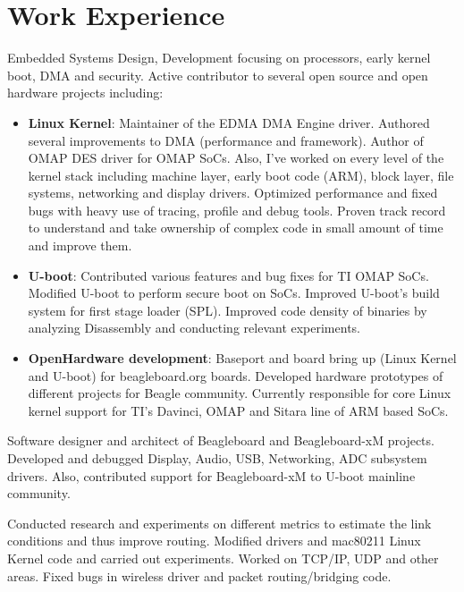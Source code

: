 \documentclass[11pt,a4paper]{moderncv}
\begin{document}
\section{Work Experience}
{Embedded Systems Design, Development focusing on processors, early kernel boot, DMA and security. Active contributor to several open source and open hardware projects including:
\begin{itemize}
\item \textbf{Linux Kernel}: Maintainer of the EDMA DMA Engine driver. Authored several improvements to DMA (performance and framework). Author of OMAP DES driver for OMAP SoCs. Also, I've worked on every level of the kernel stack including machine layer, early boot code (ARM), block layer, file systems, networking and display drivers. Optimized performance and fixed bugs with heavy use of tracing, profile and debug tools. Proven track record to understand and take ownership of complex code in small amount of time and improve them.
\item \textbf{U-boot}: Contributed various features and bug fixes for TI OMAP SoCs. Modified U-boot to perform secure boot on SoCs. Improved U-boot's build system for first stage loader (SPL). Improved code density of binaries by analyzing Disassembly and conducting relevant experiments.
\item \textbf{OpenHardware development}: Baseport and board bring up (Linux Kernel and U-boot) for beagleboard.org boards. Developed hardware prototypes of different projects for Beagle community. Currently responsible for core Linux kernel support for TI's Davinci, OMAP and Sitara line of ARM based SoCs.
\end{itemize}}
\newline
{}
{Software designer and architect of Beagleboard and Beagleboard-xM projects. Developed and debugged Display, Audio, USB, Networking, ADC subsystem drivers. Also, contributed support for Beagleboard-xM to U-boot mainline community.}

{Conducted research and experiments on different metrics to estimate the link conditions and thus improve routing. Modified drivers and mac80211 Linux Kernel code and carried out experiments. Worked on TCP/IP, UDP and other areas. Fixed bugs in wireless driver and packet routing/bridging code.}
\end{document}
